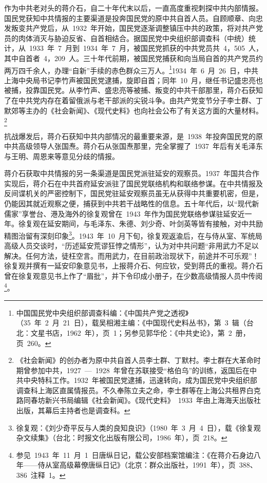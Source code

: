 作为中共老对头的蒋介石，自二十年代末以后，一直高度重视刺探中共内部情报。国民党获知中共情报的主要渠道是投奔国民党的原中共自首人员。自顾顺章、向忠发叛变共产党后，从~1932~年开始，国民党逐渐调整镇压中共的政策，将对共产党员的肉体消灭与胁迫反省、自首相结合。据国民党中央组织部调查科（中统）统计，从~1933~年~7~月到~1934~年~7~月，被国民党抓获的中共党员共~4，505~人，其中自首者~4，209~人。三十年代前期，被国民党捕获和向当局自首的共产党员约两万四千余人，办理“自新”手续的赤色群众三万人。\footnote{中国国民党中央组织部调查科编：《中国共产党之透视》（35~年~2~月~21~日），载吴相湘主编：《中国现代史料丛书》，第~3~辑（台北：文星书店，1962~年），页~1；另参见郭华伦：《中共史论》，第~2~册，页~260。}1934~年~6~月~26~日，中共上海中央局书记李竹声被国民党逮捕，旋即自首；同年~10~月，继任书记盛忠亮也被捕，投靠国民党。从李竹声、盛忠亮等被捕、叛变的中共干部那里，蒋介石获知了在中共党内存在着留俄派与老干部派的尖锐斗争。由共产党变节分子李士群、丁默郊等主办的《社会新闻》、《现代史料》也向社会公布了有关这方面的大量材料。\footnote{《社会新闻》的创办者为原中共自首人员李士群、丁默村。李士群在大革命时期曾参加中共，1927~—~1928~年曾在苏联接受“格伯乌”的训练，返国后在中共中央特科工作。1932~年被国民党逮捕，迅速转向，成为国民党中央组织部调查科上海区直属情报员。不久奉陈立夫之命，李士群等在上海公共租界白克路同春坊新兴书局编辑《社会新闻》。《现代史料》~1933~年由上海海天出版社出版，其幕后主持者也是调查科。}

抗战爆发后，蒋介石获知中共内部情况的最重要来源，是~1938~年投奔国民党的原中共高级领导人张国焘。蒋介石从张国焘那里，完全掌握了~1937~年后有关毛泽东与王明、周恩来等意见分歧的情报。

蒋介石获取中共情报的另一条渠道是国民党派驻延安的观察员。1937~年国共合作实现后，蒋介石在中共首府延安派驻了国民党联络机构和联络参谋。在中共情报及反间谍机关的严密控制下，国民党驻延安观察员虽无从获得中共重要机密，但是，仍能因其就近观察之便，捕获到中共若干战略性的信息。五十年代后，以“现代新儒家”享誉台、港及海外的徐复观曾在~1943~年作为国民党联络参谋驻延安近一年。徐复观在延安期间，与毛泽东、朱德、刘少奇、叶剑英等皆有接触，对中共励精图治留有深刻印象\footnote{徐复观：《刘少奇平反与人类的良知良识》（1980~年~3~月~4~日），载《徐复观杂文续集》（台北：时报文化出版有限公司，1986~年），页~218。}。1943~年~10~月下旬，徐复观返渝后，在与侍从室、军统局高级人员交谈时，“历述延安荒谬狂悖之情形”，认为对中共问题“非用武力不足以解决。任何方法，徒枉空言。而用武力，在目前政治现状下，前途并不可乐观”！徐复观并撰有一延安印象意见书，上报蒋介石、何应钦，受到蒋氏的重视。蒋介石曾在徐复观意见书上作了“眉批”，并下令印成小册子，在少数高级情报人员中传阅\footnote{参见~1943~年~11~月~1~日唐纵日记，载公安部档案馆编注：《在蒋介石身边八年——侍从室高级幕僚唐纵日记》（北京：群众出版社，1991~年），页~388、386~注释~1。}。

